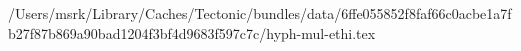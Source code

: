 /Users/msrk/Library/Caches/Tectonic/bundles/data/6ffe055852f8faf66c0acbe1a7fb27f87b869a90bad1204f3bf4d9683f597c7c/hyph-mul-ethi.tex